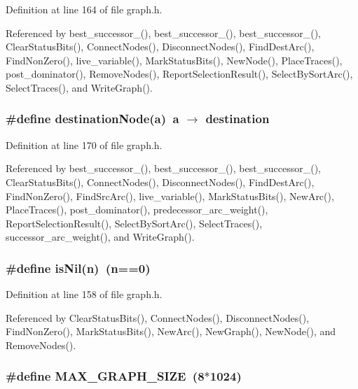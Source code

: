 Definition at line 164 of file graph.h.

Referenced by best\_\-successor\_(), best\_\-successor\_(), best\_\-successor\_(), Clear\-Status\-Bits(), Connect\-Nodes(), Disconnect\-Nodes(), Find\-Dest\-Arc(), Find\-Non\-Zero(), live\_\-variable(), Mark\-Status\-Bits(), New\-Node(), Place\-Traces(), post\_\-dominator(), Remove\-Nodes(), Report\-Selection\-Result(), Select\-By\-Sort\-Arc(), Select\-Traces(), and Write\-Graph().
\subsubsection{\setlength{\rightskip}{0pt plus 5cm}\#define destination\-Node(a)~a $\rightarrow$ destination}\label{graph_8h_f9f5eb9bb55a39f2f0268350da93776b}




Definition at line 170 of file graph.h.

Referenced by best\_\-successor\_(), best\_\-successor\_(), best\_\-successor\_(), Clear\-Status\-Bits(), Connect\-Nodes(), Disconnect\-Nodes(), Find\-Dest\-Arc(), Find\-Non\-Zero(), Find\-Src\-Arc(), live\_\-variable(), Mark\-Status\-Bits(), New\-Arc(), Place\-Traces(), post\_\-dominator(), predecessor\_\-arc\_\-weight(), Report\-Selection\-Result(), Select\-By\-Sort\-Arc(), Select\-Traces(), successor\_\-arc\_\-weight(), and Write\-Graph().
\subsubsection{\setlength{\rightskip}{0pt plus 5cm}\#define is\-Nil(n)~(n==0)}\label{graph_8h_8e0d0eeec985380fe0260b8ca0878596}




Definition at line 158 of file graph.h.

Referenced by Clear\-Status\-Bits(), Connect\-Nodes(), Disconnect\-Nodes(), Find\-Non\-Zero(), Mark\-Status\-Bits(), New\-Arc(), New\-Graph(), New\-Node(), and Remove\-Nodes().
\subsubsection{\setlength{\rightskip}{0pt plus 5cm}\#define MAX\_\-GRAPH\_\-SIZE~(8$\ast$1024)}\label{graph_8h_89a5c95f5b7b59e8afb5651868beee1f}




